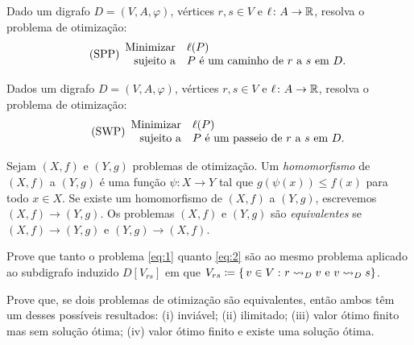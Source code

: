 \documentclass[10pt,reqno]{amsart}
\begin{document}
\begin{problem*}
  Dado um digrafo \(D = (V,A,\varphi)\), vértices \(r,s \in V\) e
  \(\ell \colon A \to \mathbb{R}\), resolva o problema de otimização:
  \begin{equation}
    \label{eq:2}
    \tag{SPP}
    \begin{array}{{rl}}
      \text{Minimizar} & \ell(P) \\
      \text{sujeito a} & \text{\(P\) é um caminho de \(r\) a \(s\) em~\(D\)}.
    \end{array}
  \end{equation}
\end{problem*}

\begin{problem*}
  Dados um digrafo \(D = (V,A,\varphi)\), vértices \(r,s \in V\) e
  \(\ell \colon A \to \mathbb{R}\), resolva o problema de otimização:
  \begin{equation}
    \label{eq:3}
    \tag{SWP}
    \begin{array}{{rl}}
      \text{Minimizar}   & \ell(P) \\
      \text{sujeito a} & \text{\(P\) é um passeio de \(r\) a \(s\) em~\(D\)}.
    \end{array}
  \end{equation}
\end{problem*}

\begin{definition*}
  Sejam \((X,f)\) e \((Y,g)\) problemas de otimização.  Um
  \emph{homomorfismo} de \((X,f)\) a \((Y,g)\) é uma função
  \(\psi \colon X \to Y\) tal que \(g(\psi(x)) \leq f(x)\) para todo
  \(x \in X\).  Se existe um homomorfismo de \((X,f)\) a
  \((Y,g)\), escrevemos \((X,f) \to (Y,g)\).  Os problemas \((X,f)\) e
  \((Y,g)\) são \emph{equivalentes} se \((X,f) \to (Y,g)\) e
  \((Y,g) \to (X,f)\).
\end{definition*}

\begin{exercise}
  \label{ex:1}
  Prove que tanto o problema \eqref{eq:1} quanto \eqref{eq:2} são     
  ao mesmo problema aplicado ao subdigrafo induzido \(D[V_{rs}]\)
  em que
  \(V_{rs} \coloneqq \{\,{v \in V}\,\colon{r \rightsquigarrow_D v \text{ e }v
    \rightsquigarrow_D s}\}\).
\end{exercise}

\begin{exercise}
  Prove que, se dois problemas de otimização são equivalentes, então
  ambos têm um desses possíveis resultados: (i) inviável; (ii) ilimitado;
  (iii) valor ótimo finito mas sem solução ótima; (iv) valor ótimo finito
  e existe uma solução ótima.
\end{exercise}
\end{document}
